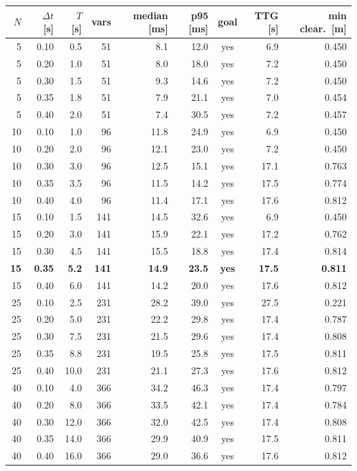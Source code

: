 \begin{tabular}{rrrrrrcrr}
  \toprule
  $N$ & $\Delta t$ [s] & $T$ [s] & vars & median [ms] & p95 [ms] & goal & TTG [s] & min clear.\ [m] \\
  \midrule
  5 & 0.10 & 0.5 & 51 & 8.1 & 12.0 & yes & 6.9 & 0.450 \\
  5 & 0.20 & 1.0 & 51 & 8.0 & 18.0 & yes & 7.2 & 0.450 \\
  5 & 0.30 & 1.5 & 51 & 9.3 & 14.6 & yes & 7.2 & 0.450 \\
  5 & 0.35 & 1.8 & 51 & 7.9 & 21.1 & yes & 7.0 & 0.454 \\
  5 & 0.40 & 2.0 & 51 & 7.4 & 30.5 & yes & 7.2 & 0.457 \\
  10 & 0.10 & 1.0 & 96 & 11.8 & 24.9 & yes & 6.9 & 0.450 \\
  10 & 0.20 & 2.0 & 96 & 12.1 & 23.0 & yes & 7.2 & 0.450 \\
  10 & 0.30 & 3.0 & 96 & 12.5 & 15.1 & yes & 17.1 & 0.763 \\
  10 & 0.35 & 3.5 & 96 & 11.5 & 14.2 & yes & 17.5 & 0.774 \\
  10 & 0.40 & 4.0 & 96 & 11.4 & 17.1 & yes & 17.6 & 0.812 \\
  15 & 0.10 & 1.5 & 141 & 14.5 & 32.6 & yes & 6.9 & 0.450 \\
  15 & 0.20 & 3.0 & 141 & 15.9 & 22.1 & yes & 17.2 & 0.762 \\
  15 & 0.30 & 4.5 & 141 & 15.5 & 18.8 & yes & 17.4 & 0.814 \\
  \textbf{15} & \textbf{0.35} & \textbf{5.2} & \textbf{141} & \textbf{14.9} & \textbf{23.5} & \textbf{yes} & \textbf{17.5} & \textbf{0.811} \\
  15 & 0.40 & 6.0 & 141 & 14.2 & 20.0 & yes & 17.6 & 0.812 \\
  25 & 0.10 & 2.5 & 231 & 28.2 & 39.0 & yes & 27.5 & 0.221 \\
  25 & 0.20 & 5.0 & 231 & 22.2 & 29.8 & yes & 17.4 & 0.787 \\
  25 & 0.30 & 7.5 & 231 & 21.5 & 29.6 & yes & 17.4 & 0.808 \\
  25 & 0.35 & 8.8 & 231 & 19.5 & 25.8 & yes & 17.5 & 0.811 \\
  25 & 0.40 & 10.0 & 231 & 21.1 & 27.3 & yes & 17.6 & 0.812 \\
  40 & 0.10 & 4.0 & 366 & 34.2 & 46.3 & yes & 17.4 & 0.797 \\
  40 & 0.20 & 8.0 & 366 & 33.5 & 42.1 & yes & 17.4 & 0.784 \\
  40 & 0.30 & 12.0 & 366 & 32.0 & 42.5 & yes & 17.4 & 0.808 \\
  40 & 0.35 & 14.0 & 366 & 29.9 & 40.9 & yes & 17.5 & 0.811 \\
  40 & 0.40 & 16.0 & 366 & 29.0 & 36.6 & yes & 17.6 & 0.812 \\
  \bottomrule
\end{tabular}
